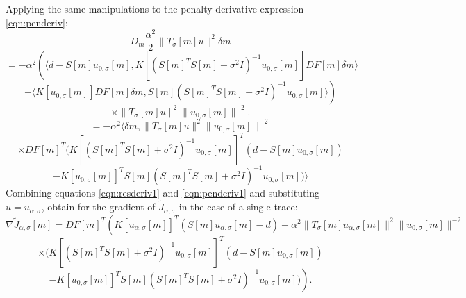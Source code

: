 Applying the same manipulations to the penalty derivative expression \ref{eqn:penderiv}:
\[
  D_m \frac{\alpha^2}{2}\|T_{\sigma}[m] u\|^2\delta m 
\]
\[
  =-\alpha^2\left( \langle d-S[m]u_{0,\sigma}[m], K[(S[m]^TS[m] + \sigma^2I)^{-1}u_{0,\sigma}[m]] DF[m]\delta m \rangle \right.
\]
\[
  \left. - \langle K[u_{0,\sigma}[m] ]DF[m]\delta m, S[m](S[m]^TS[m] + \sigma^2I)^{-1}u_{0,\sigma}[m]\rangle \right)
\]
\[
  \times  \|T_{\sigma}[m]u\|^2\| u_{0,\sigma}[m]\|^{-2}.
\]
\[
  = -\alpha^2 \langle \delta m, \|T_{\sigma}[m]u\|^2\| u_{0,\sigma}[m]\|^{-2}
\]
\[
  \times DF[m]^T(K[(S[m]^TS[m] + \sigma^2I)^{-1}u_{0,\sigma}[m]]^T (d-S[m]u_{0,\sigma}[m]) 
\]
\begin{equation}
  \label{eqn:penderiv1}
  -K[u_{0,\sigma}[m]]^T S[m](S[m]^TS[m] + \sigma^2I)^{-1}u_{0,\sigma}[m]) \rangle
\end{equation}
Combining equations \ref{eqn:resderiv1} and \ref{eqn:penderiv1} and substituting $u = u_{\alpha,\sigma}$, obtain for the gradient of $\tilde{J}_{\alpha,\sigma}$ in the case of a single trace:
\[
  \nabla \tilde{J}_{\alpha,\sigma}[m] = DF[m]^T\left( K[u_{\alpha,\sigma}[m]]^T(S[m]u_{\alpha,\sigma}[m]-d) - \alpha^2 \|T_{\sigma}[m]u_{\alpha,\sigma}[m]\|^2\| u_{0,\sigma}[m]\|^{-2}\right.
\]
\[
  \left. \times( K[(S[m]^TS[m] + \sigma^2I)^{-1}u_{0,\sigma}[m]]^T (d-S[m]u_{0,\sigma}[m]) \right.
\]
\begin{equation}
  \label{eqn:singlegrad}
\left.-K[u_{0,\sigma}[m]]^T S[m](S[m]^TS[m] + \sigma^2I)^{-1}u_{0,\sigma}[m]) \right).
\end{equation}

